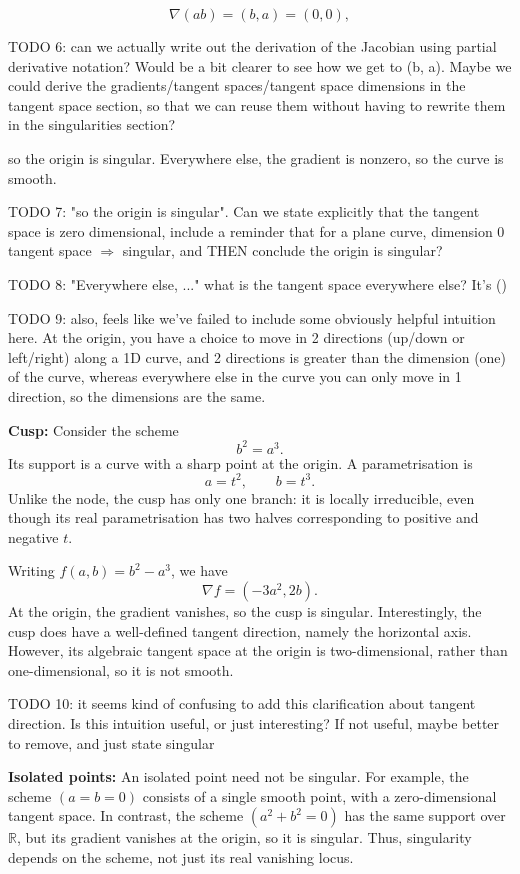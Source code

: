 \documentclass[12pt]{article}
\begin{document}
\[
\nabla(ab)=(b,a)=(0,0),
\]

TODO 6: can we actually write out the derivation of the Jacobian using partial derivative notation? Would be a bit clearer to see how we get to (b, a). Maybe we could derive the gradients/tangent spaces/tangent space dimensions in the tangent space section, so that we can reuse them without having to rewrite them in the singularities section?

so the origin is singular. Everywhere else, the gradient is
nonzero, so the curve is smooth.

TODO 7: "so the origin is singular". Can we state explicitly that the tangent space is zero dimensional, include a reminder that for a plane curve, dimension 0 tangent space $\Rightarrow$ singular, and THEN conclude the origin is singular?

TODO 8: "Everywhere else, ..." what is the tangent space everywhere else? It's ()

TODO 9: also, feels like we've failed to include some obviously helpful intuition here. At the origin, you have a choice to move in 2 directions (up/down or left/right) along a 1D curve, and 2 directions is greater than the dimension (one) of the curve, whereas everywhere else in the curve you can only move in 1 direction, so the dimensions are the same.

\textbf{Cusp:} Consider the scheme
\[
b^2=a^3.
\]
Its support is a curve with a sharp point at the origin.
A parametrisation is
\[
a=t^2,\qquad b=t^3.
\]
Unlike the node, the cusp has only one branch: it is locally
irreducible, even though its real parametrisation has two halves
corresponding to positive and negative $t$.

Writing $f(a,b)=b^2-a^3$, we have
\[
\nabla f=(-3a^2,2b).
\]
At the origin, the gradient vanishes, so the cusp is singular.
Interestingly, the cusp does have a well-defined tangent
direction, namely the horizontal axis. However, its algebraic
tangent space at the origin is two-dimensional, rather than
one-dimensional, so it is not smooth.

TODO 10: it seems kind of confusing to add this clarification about tangent direction. Is this intuition useful, or just interesting? If not useful, maybe better to remove, and just state singular

\textbf{Isolated points:} An isolated point need not be singular.
For example, the scheme $(a=b=0)$ consists of a single smooth
point, with a zero-dimensional tangent space. In contrast,
the scheme $(a^2+b^2=0)$ has the same support over $\mathbb R$,
but its gradient vanishes at the origin, so it is singular.
Thus, singularity depends on the scheme, not just its real
vanishing locus.
\end{document}
